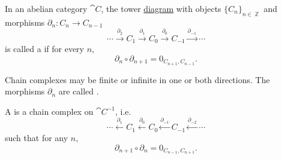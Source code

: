 \begin{definition}\label{def:chain_complex}\mcite\cite{nLab:chain_complex}
  In an abelian category \( \cat{C} \), the tower \hyperref[def:tower_diagram]{diagram} with objects \( \{ C_n \}_{n \in \BbbZ} \) and morphisms \( \partial_n: C_n \to C_{n-1} \)
  \begin{equation}\label{def:chain_complex/chain_diagram}
    \cdots
    \overset {\partial_2} \longrightarrow
    C_1
    \overset {\partial_1} \longrightarrow
    C_0
    \overset {\partial_0} \longrightarrow
    C_{-1}
    \overset {\partial_{-1}} \longrightarrow
    \cdots
  \end{equation}
  is called a  if for every \( n \),
  \begin{equation*}
    \partial_n \circ \partial_{n+1} = 0_{C_{n+1},C_{n-1}}.
  \end{equation*}

  Chain complexes may be finite or infinite in one or both directions. The morphisms \( \partial_n \) are called .

  A  is a chain complex on \( \cat{C}^{-1} \), i.e.
  \begin{equation}\label{def:chain_complex/cochain_diagram}
    \cdots
    \overset {\partial_1} \longleftarrow
    C_1
    \overset {\partial_0} \longleftarrow
    C_0
    \overset {\partial_{-1}} \longleftarrow
    C_{-1}
    \overset {\partial_{-2}} \longleftarrow
    \cdots
  \end{equation}
  such that for any \( n \),
  \begin{equation*}
    \partial_{n+1} \circ \partial_n = 0_{C_{n-1},C_{n+1}}.
  \end{equation*}
\end{definition}

